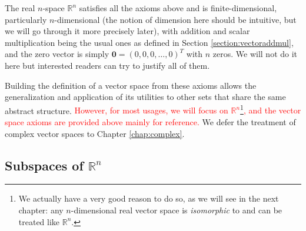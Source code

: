 The real $n$-space $\mathbb{R}^n$ satisfies all the axioms above and is finite-dimensional, particularly $n$-dimensional (the notion of dimension here should be intuitive, but we will go through it more precisely later), with addition and scalar multiplication being the usual ones as defined in Section \ref{section:vectoraddmul}, and the zero vector is simply $\textbf{0} = (0,0,0,\ldots,0)^T$ with $n$ zeros. We will not do it here but interested readers can try to justify all of them. \par
Building the definition of a vector space from these axioms allows the generalization and application of its utilities to other sets that share the same abstract structure. \textcolor{red}{However, for most usages, we will focus on $\mathbb{R}^n$\footnote{We actually have a very good reason to do so, as we will see in the next chapter: any $n$-dimensional real vector space is \textit{isomorphic} to and can be treated like $\mathbb{R}^n$.}, and the vector space axioms are provided above mainly for reference.} We defer the treatment of complex vector spaces to Chapter \ref{chap:complex}.

\subsection{Subspaces of $\mathbb{R}^n$}
\label{section:Rnsubspace}

